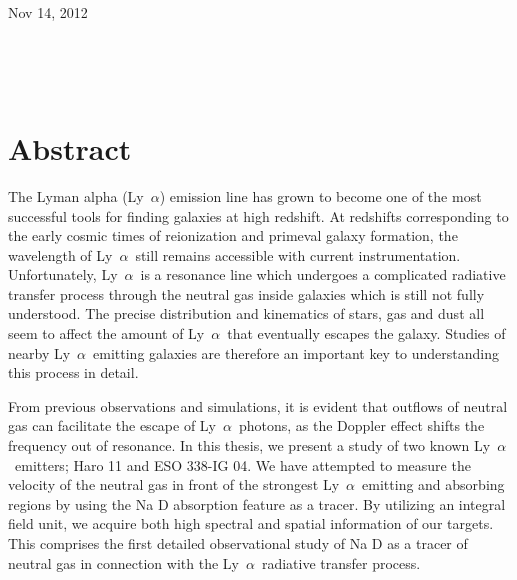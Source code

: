 \documentclass[a4wide,12pt]{book}
\newcommand{\lya}{Ly~${\alpha}$}
\begin{document}
\begin{center}
\large{Nov 14, 2012}\\
\end{center}
\thispagestyle{empty}
\fancyhf{}
\fancyhead{}
\rule[1cm]{0cm}{0.0cm} \\
\scriptsize{\emph{}\\
\clearpage
\normalsize
{}
\fancyhf{}
\fancyhead{}

\renewcommand{\chaptername}{}
\renewcommand{\chaptermark}[1]{\markboth{#1}{}}
\renewcommand{\sectionmark}[1]{\markright{#1}{}}
\fancyhead[RE]{\it \textbf{ }}

\fancyhead[LE]{\thepage}
\fancyhead[RO]{\thepage}

\renewcommand{\headrulewidth}{0.4pt}


\chapter*{Abstract}
\thispagestyle{empty}

The Lyman alpha (\lya ) emission line has grown to become one of the most successful tools for finding galaxies at high redshift. At redshifts corresponding to the early cosmic times of reionization and primeval galaxy formation, the wavelength of \lya\ still remains accessible with current instrumentation. Unfortunately, \lya\ is a resonance line which undergoes a complicated radiative transfer process through the neutral gas inside galaxies which is still not fully understood. The precise distribution and kinematics of stars, gas and dust all seem to affect the amount of \lya\ that eventually escapes the galaxy. Studies of nearby \lya\ emitting galaxies are therefore an important key to understanding this process in detail. 

From previous observations and simulations, it is evident that outflows of neutral gas can facilitate the escape of \lya\ photons, as the Doppler effect shifts the frequency out of resonance.
In this thesis, we present a study of two known \lya\ emitters; Haro 11 and ESO 338-IG 04. We have attempted to measure the velocity of the neutral gas in front of the strongest \lya\ emitting and absorbing regions by using the Na D absorption feature as a tracer. By utilizing an integral field unit, we acquire both high spectral and spatial information of our targets. This comprises the first detailed observational study of Na D as a tracer of neutral gas in connection with the \lya\ radiative transfer process.

}
\end{document}
